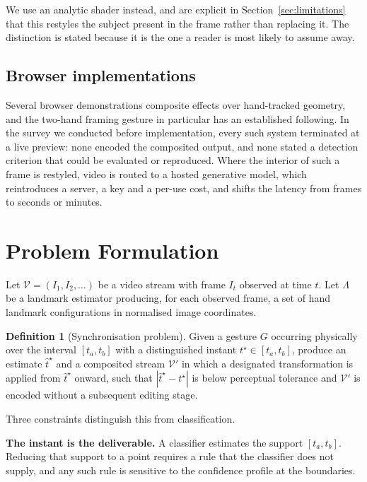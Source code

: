 \documentclass{article}
\theoremstyle{definition}
\newtheorem{definition}{Definition}
\begin{document}
We use an analytic shader instead, and are explicit in
Section~\ref{sec:limitations} that this restyles the subject present in the
frame rather than replacing it. The distinction is stated because it is the one
a reader is most likely to assume away.

\subsection{Browser implementations}

Several browser demonstrations composite effects over hand-tracked geometry, and
the two-hand framing gesture in particular has an established following. In the
survey we conducted before implementation, every such system terminated at a
live preview: none encoded the composited output, and none stated a detection
criterion that could be evaluated or reproduced. Where the interior of such a
frame is restyled, video is routed to a hosted generative model, which
reintroduces a server, a key and a per-use cost, and shifts the latency from
frames to seconds or minutes.

\section{Problem Formulation}

Let $\mathcal{V} = (I_1, I_2, \dots)$ be a video stream with frame $I_t$
observed at time $t$. Let $\Lambda$ be a landmark estimator producing, for each
observed frame, a set of hand landmark configurations in normalised image
coordinates.

\begin{definition}[Synchronisation problem]
Given a gesture $G$ occurring physically over the interval $[t_a, t_b]$ with a
distinguished instant $t^\star \in [t_a, t_b]$, produce an estimate
$\hat{t}^\star$ and a composited stream $\mathcal{V}'$ in which a designated
transformation is applied from $\hat{t}^\star$ onward, such that
$|\hat{t}^\star - t^\star|$ is below perceptual tolerance and $\mathcal{V}'$ is
encoded without a subsequent editing stage.
\end{definition}

Three constraints distinguish this from classification.

\textbf{The instant is the deliverable.} A classifier estimates the support
$[t_a, t_b]$. Reducing that support to a point requires a rule that the
classifier does not supply, and any such rule is sensitive to the confidence
profile at the boundaries.
\end{document}
